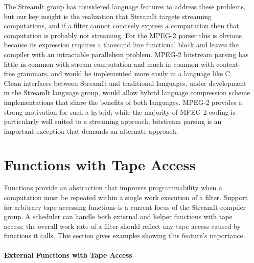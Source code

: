 The StreamIt group has considered language features to address these 
problems, but our key insight is the realization that StreamIt targets 
streaming computations, and if a filter cannot concisely express a 
computation then that computation is probably not streaming. For the MPEG-2 
parser this is obvious because its expression requires a thousand line 
functional block and leaves the compiler with an intractable parallelism 
problem. MPEG-2 bitstream parsing has little in common with stream 
computation and much in common with context-free grammars, and would be 
implemented more easily in a language like C. Clean interfaces between 
StreamIt and traditional languages, under development in the StreamIt 
language group, would allow hybrid language compression scheme implementations 
that share the benefits of both languages. MPEG-2 provides a strong motivation
for such a hybrid; while the majority of MPEG-2 coding is particularly well 
suited to a streaming approach, bitstream parsing is an important exception 
that demands an alternate approach.

\section{Functions with Tape Access}

Functions provide an abstraction that improves programmability when a computation 
must be repeated within a single work execution of a filter. Support for arbitrary 
tape accessing functions is a current focus of the StreamIt compiler group. A 
scheduler can handle both external and helper functions with tape access; the 
overall work rate of a filter should reflect any tape access caused by functions 
it calls. This section gives examples showing this feature's importance. 

\paragraph{External Functions with Tape Access}

